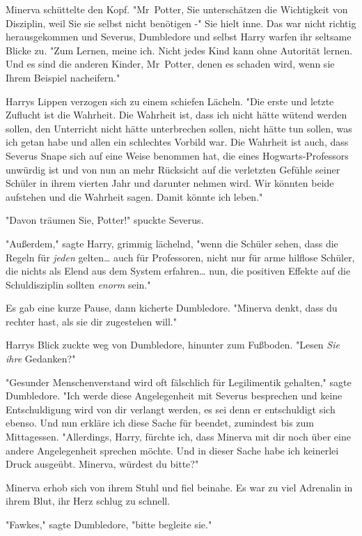 {Minerva schüttelte den Kopf. "Mr~Potter, Sie unterschätzen die Wichtigkeit von Disziplin, weil Sie sie selbst nicht benötigen -" Sie hielt inne. Das war nicht richtig herausgekommen und Severus, Dumbledore und selbst Harry warfen ihr seltsame Blicke zu. "Zum Lernen, meine ich. Nicht jedes Kind kann ohne Autorität lernen. Und es sind die anderen Kinder, Mr~Potter, denen es schaden wird, wenn sie Ihrem Beispiel nacheifern."

Harrys Lippen verzogen sich zu einem schiefen Lächeln. "Die erste und letzte Zuflucht ist die Wahrheit. Die Wahrheit ist, dass ich nicht hätte wütend werden sollen, den Unterricht nicht hätte unterbrechen sollen, nicht hätte tun sollen, was ich getan habe und allen ein schlechtes Vorbild war. Die Wahrheit ist auch, dass Severus Snape sich auf eine Weise benommen hat, die eines Hogwarts-Professors unwürdig ist und von nun an mehr Rücksicht auf die verletzten Gefühle seiner Schüler in ihrem vierten Jahr und darunter nehmen wird. Wir könnten beide aufstehen und die Wahrheit sagen. Damit könnte ich leben."

"Davon träumen Sie, Potter!" spuckte Severus.

"Außerdem," sagte Harry, grimmig lächelnd, "wenn die Schüler sehen, dass die Regeln für \emph{jeden} gelten… auch für Professoren, nicht nur für arme hilflose Schüler, die nichts als Elend aus dem System erfahren… nun, die positiven Effekte auf die Schuldisziplin sollten \emph{enorm} sein."

Es gab eine kurze Pause, dann kicherte Dumbledore. "Minerva denkt, dass du rechter hast, als sie dir zugestehen will."

Harrys Blick zuckte weg von Dumbledore, hinunter zum Fußboden. "Lesen \emph{Sie ihre} Gedanken?"

"Gesunder Menschenverstand wird oft fälschlich für Legilimentik gehalten," sagte Dumbledore. "Ich werde diese Angelegenheit mit Severus besprechen und keine Entschuldigung wird von dir verlangt werden, es sei denn er entschuldigt sich ebenso. Und nun erkläre ich diese Sache für beendet, zumindest bis zum Mittagessen. "Allerdings, Harry, fürchte ich, dass Minerva mit dir noch über eine andere Angelegenheit sprechen möchte. Und in dieser Sache habe ich keinerlei Druck ausgeübt. Minerva, würdest du bitte?"

Minerva erhob sich von ihrem Stuhl und fiel beinahe. Es war zu viel Adrenalin in ihrem Blut, ihr Herz schlug zu schnell.

"Fawkes," sagte Dumbledore, "bitte begleite sie."

}
